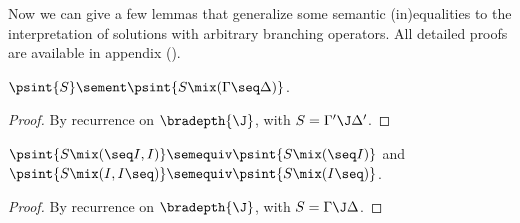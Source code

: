 

Now we can give a few lemmas that generalize some semantic (in)equalities to the
interpretation of solutions with arbitrary branching operators. All detailed
proofs are available in appendix ().

\begin{lemma}
  $\psint{S} \sement \psint{S \mix (\Gamma \seq \Delta)}$.
\end{lemma}
\begin{proof}
  By recurrence on $\bradepth{\J}$, with $S = \Gamma' \J \Delta'$.
\end{proof}

\begin{lemma}
  $\psint{S \mix (\seq I, I)} \semequiv \psint{S \mix (\seq I)}$ and
  $\psint{S \mix (I, I \seq)} \semequiv \psint{S \mix (I \seq)}$.
\end{lemma}
\begin{proof}
  By recurrence on $\bradepth{\J}$, with $S = \Gamma \J \Delta$.
\end{proof}

